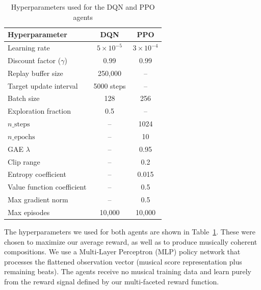 \documentclass{article}
\begin{document}
\begin{table}[htbp]
    \centering
    \caption{Hyperparameters used for the DQN and PPO agents}
    \label{tab:dqn_ppo_hyperparameters}

    \begin{tabular}{lcc}
        \hline
        \textbf{Hyperparameter} & \textbf{DQN} & \textbf{PPO} \\
        \hline
        Learning rate               & $5 \times 10^{-5}$  & $3 \times 10^{-4}$ \\
        Discount factor ($\gamma$)  & 0.99                & 0.99 \\
        Replay buffer size          & 250{,}000           & -- \\
        Target update interval      & 5000 steps          & -- \\
        Batch size                  & 128                 & 256 \\
        Exploration fraction        & 0.5                 & -- \\
        $n\_\text{steps}$           & --                  & 1024 \\
        $n\_\text{epochs}$          & --                  & 10 \\
        GAE $\lambda$               & --                  & 0.95 \\
        Clip range                  & --                  & 0.2 \\
        Entropy coefficient         & --                  & 0.015 \\
        Value function coefficient  & --                  & 0.5 \\
        Max gradient norm           & --                  & 0.5 \\
        Max episodes                & 10{,}000            & 10{,}000 \\
        \hline
    \end{tabular}
\end{table}

The hyperparameters we used for both agents are shown in Table~\ref{tab:dqn_ppo_hyperparameters}. These were chosen to maximize our average reward, as well as to produce musically coherent compositions. We use a Multi-Layer Perceptron (MLP) policy network that processes the flattened observation vector (musical score representation plus remaining beats). The agents receive no musical training data and learn purely from the reward signal defined by our multi-faceted reward function.
\end{document}
